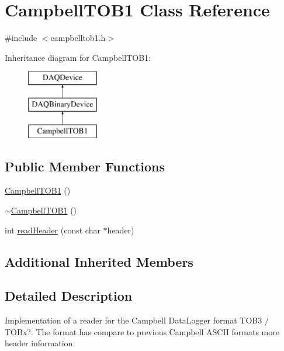 \hypertarget{classCampbellTOB1}{\section{Campbell\-T\-O\-B1 Class Reference}
\label{classCampbellTOB1}
}


{\ttfamily \#include $<$campbelltob1.\-h$>$}

Inheritance diagram for Campbell\-T\-O\-B1\-:\begin{figure}[H]
\begin{center}
\leavevmode
\includegraphics[height=3.000000cm]{classCampbellTOB1}
\end{center}
\end{figure}
\subsection*{Public Member Functions}
\begin{DoxyCompactItemize}
\item 
\hyperlink{classCampbellTOB1_a97fb5dfccd67207325b7db97c20fca72}{Campbell\-T\-O\-B1} ()
\item 
\hyperlink{classCampbellTOB1_a4ce5f8a2bd90b20b7ad2cf6ecb26ec7b}{$\sim$\-Campbell\-T\-O\-B1} ()
\item 
int \hyperlink{classCampbellTOB1_aad343912437691a763b7130deec5372c}{read\-Header} (const char $\ast$header)
\end{DoxyCompactItemize}
\subsection*{Additional Inherited Members}


\subsection{Detailed Description}
Implementation of a reader for the Campbell Data\-Logger format T\-O\-B3 / T\-O\-Bx?. The format has compare to previous Campbell A\-S\-C\-I\-I formats more header information. 

